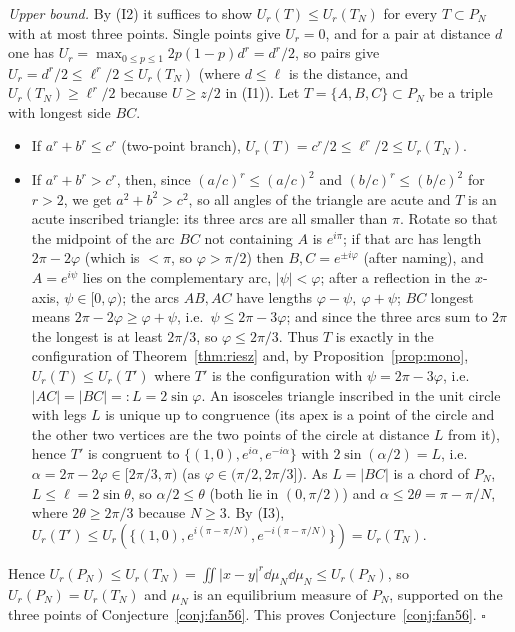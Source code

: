 \emph{Upper bound.} By (I2) it suffices to show $U_r(T)\le U_r(T_N)$ for every $T\subset P_N$ with at most three points. Single points give $U_r=0$, and for a pair at distance $d$ one has $U_r=\max_{0\le p\le1}2p(1-p)d^r=d^r/2$, so pairs give $U_r=d^r/2\le\ell^r/2\le U_r(T_N)$ (where $d\le\ell$ is the distance, and $U_r(T_N)\ge\ell^r/2$ because $U\ge z/2$ in (I1)). Let $T=\{A,B,C\}\subset P_N$ be a triple with longest side $BC$.
\begin{itemize}[leftmargin=2em]
\item If $a^r+b^r\le c^r$ (two-point branch), $U_r(T)=c^r/2\le\ell^r/2\le U_r(T_N)$.
\item If $a^r+b^r>c^r$, then, since $(a/c)^r\le(a/c)^2$ and $(b/c)^r\le (b/c)^2$ for $r>2$, we get $a^2+b^2>c^2$, so all angles of the triangle are acute and $T$ is an acute inscribed triangle: its three arcs are all smaller than $\pi$. Rotate so that the midpoint of the arc $BC$ not containing $A$ is $e^{i\pi}$; if that arc has length $2\pi-2\varphi$ (which is $<\pi$, so $\varphi>\pi/2$) then $B,C=e^{\pm i\varphi}$ (after naming), and $A=e^{i\psi}$ lies on the complementary arc, $|\psi|<\varphi$; after a reflection in the $x$-axis, $\psi\in[0,\varphi)$; the arcs $AB,AC$ have lengths $\varphi-\psi,\ \varphi+\psi$; $BC$ longest means $2\pi-2\varphi\ge\varphi+\psi$, i.e.\ $\psi\le2\pi-3\varphi$; and since the three arcs sum to $2\pi$ the longest is at least $2\pi/3$, so $\varphi\le2\pi/3$. Thus $T$ is exactly in the configuration of Theorem~\ref{thm:riesz} and, by Proposition~\ref{prop:mono}, $U_r(T)\le U_r(T')$ where $T'$ is the configuration with $\psi=2\pi-3\varphi$, i.e.\ $|AC|=|BC|=:L=2\sin\varphi$. An isosceles triangle inscribed in the unit circle with legs $L$ is unique up to congruence (its apex is a point of the circle and the other two vertices are the two points of the circle at distance $L$ from it), hence $T'$ is congruent to $\{(1,0),e^{i\alpha},e^{-i\alpha}\}$ with $2\sin(\alpha/2)=L$, i.e.\ $\alpha=2\pi-2\varphi\in[2\pi/3,\pi)$ (as $\varphi\in(\pi/2,2\pi/3]$). As $L=|BC|$ is a chord of $P_N$, $L\le\ell=2\sin\theta$, so $\alpha/2\le\theta$ (both lie in $(0,\pi/2)$) and $\alpha\le2\theta=\pi-\pi/N$, where $2\theta\ge2\pi/3$ because $N\ge3$. By (I3), $U_r(T')\le U_r(\{(1,0),e^{i(\pi-\pi/N)},e^{-i(\pi-\pi/N)}\})=U_r(T_N)$.
\end{itemize}
Hence $U_r(P_N)\le U_r(T_N)=\iint|x-y|^r\dd\mu_N\dd\mu_N\le U_r(P_N)$, so $U_r(P_N)=U_r(T_N)$ and $\mu_N$ is an equilibrium measure of $P_N$, supported on the three points of Conjecture~\ref{conj:fan56}. This proves Conjecture~\ref{conj:fan56}. \hfill$\square$

